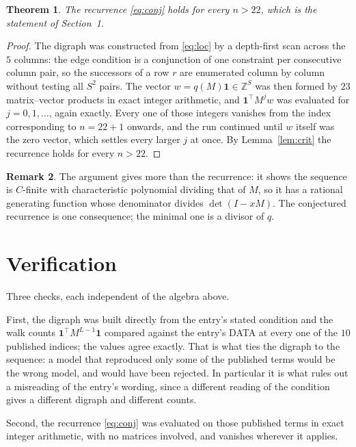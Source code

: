 \documentclass[11pt,a4paper]{article}
\theoremstyle{plain}
\newtheorem{theorem}{Theorem}
\theoremstyle{definition}
\newtheorem{remark}[theorem]{Remark}
\begin{document}
\begin{theorem}
The recurrence \eqref{eq:conj} holds for every $n>22$, which is the statement of
Section~1.
\end{theorem}

\begin{proof}
The digraph was constructed from \eqref{eq:loc} by a depth-first scan across the $5$
columns: the edge condition is a conjunction of one constraint per consecutive column
pair, so the successors of a row $r$ are enumerated column by column without testing all
$S^2$ pairs. The vector $w=q(M)\mathbf{1}\in\mathbb{Z}^{S}$ was then formed by $23$
matrix--vector products in exact integer arithmetic, and $\mathbf{1}^{\!\top}M^{j}w$ was
evaluated for $j=0,1,\dots$, again exactly. Every one of those integers vanishes from the
index corresponding to $n=22+1$ onwards, and the run continued until $w$ itself was the
zero vector, which settles every larger $j$ at once. By Lemma~\ref{lem:crit} the recurrence
holds for every $n>22$.
\end{proof}

\begin{remark}
The argument gives more than the recurrence: it shows the sequence is $C$-finite with
characteristic polynomial dividing that of $M$, so it has a rational generating function
whose denominator divides $\det(I-xM)$. The conjectured recurrence is one consequence; the
minimal one is a divisor of $q$.
\end{remark}

\section{Verification}

Three checks, each independent of the algebra above.

First, the digraph was built directly from the entry's stated condition and the walk counts
$\mathbf{1}^{\!\top}M^{L-1}\mathbf{1}$ compared against the entry's DATA at
every one of the $10$ published indices; the values agree exactly. That is what ties
the digraph to the sequence: a model that reproduced only some of the published terms would
be the wrong model, and would have been rejected. In particular it is what rules out a
misreading of the entry's wording, since a different reading of the condition gives a
different digraph and different counts.

Second, the recurrence \eqref{eq:conj} was evaluated on those published terms in exact
integer arithmetic, with no matrices involved, and vanishes wherever it applies.
\end{document}
